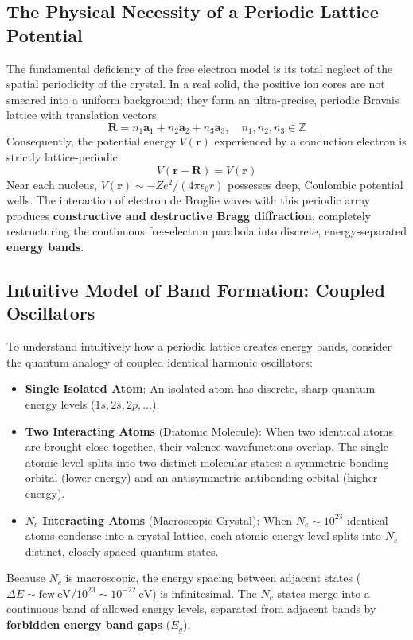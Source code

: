 \documentclass[11pt,a4paper]{article}
\newcommand{\vb}[1]{\mathbf{#1}}
\begin{document}
\subsection{The Physical Necessity of a Periodic Lattice Potential}
The fundamental deficiency of the free electron model is its total neglect of the spatial periodicity of the crystal. In a real solid, the positive ion cores are not smeared into a uniform background; they form an ultra-precise, periodic Bravais lattice with translation vectors:
\begin{equation}
\vb{R} = n_1 \vb{a}_1 + n_2 \vb{a}_2 + n_3 \vb{a}_3, \quad n_1, n_2, n_3 \in \mathbb{Z}
\label{eq:lattice_translation}
\end{equation}
Consequently, the potential energy $V(\vb{r})$ experienced by a conduction electron is strictly lattice-periodic:
\begin{equation}
\boxed{V(\vb{r} + \vb{R}) = V(\vb{r})}
\label{eq:periodic_potential}
\end{equation}
Near each nucleus, $V(\vb{r}) \sim -Z e^2 / (4\pi\epsilon_0 r)$ possesses deep, Coulombic potential wells. The interaction of electron de Broglie waves with this periodic array produces \textbf{constructive and destructive Bragg diffraction}, completely restructuring the continuous free-electron parabola into discrete, energy-separated \textbf{energy bands}.

\subsection{Intuitive Model of Band Formation: Coupled Oscillators}
To understand intuitively how a periodic lattice creates energy bands, consider the quantum analogy of coupled identical harmonic oscillators:
\begin{itemize}[leftmargin=*]
    \item \textbf{Single Isolated Atom}: An isolated atom has discrete, sharp quantum energy levels ($1s, 2s, 2p, \dots$).
    \item \textbf{Two Interacting Atoms} (Diatomic Molecule): When two identical atoms are brought close together, their valence wavefunctions overlap. The single atomic level splits into two distinct molecular states: a symmetric bonding orbital (lower energy) and an antisymmetric antibonding orbital (higher energy).
    \item \textbf{$N_c$ Interacting Atoms} (Macroscopic Crystal): When $N_c \sim 10^{23}$ identical atoms condense into a crystal lattice, each atomic energy level splits into $N_c$ distinct, closely spaced quantum states. 
\end{itemize}
Because $N_c$ is macroscopic, the energy spacing between adjacent states ($\Delta E \sim \mathrm{few\ eV} / 10^{23} \sim 10^{-22}\ \mathrm{eV}$) is infinitesimal. The $N_c$ states merge into a continuous band of allowed energy levels, separated from adjacent bands by \textbf{forbidden energy band gaps} ($E_g$).
\end{document}
